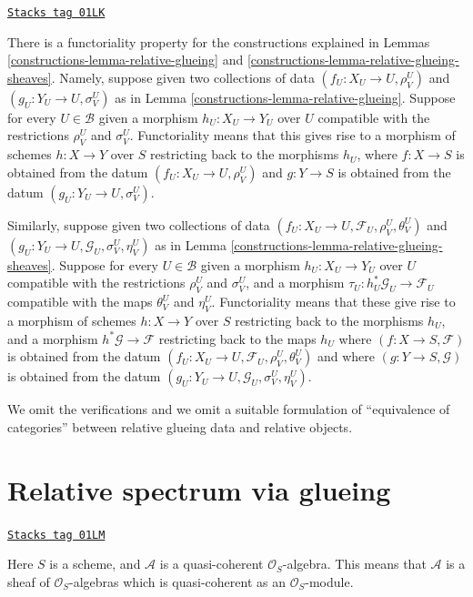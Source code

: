 \begin{remark}
\label{constructions-remark-relative-glueing-functorial}
\href{https://stacks.math.columbia.edu/tag/01LK}{\texttt{Stacks tag 01LK}}

There is a functoriality property for the constructions explained
in Lemmas \ref{constructions-lemma-relative-glueing} and
\ref{constructions-lemma-relative-glueing-sheaves}. Namely, suppose given
two collections of data $(f_U : X_U \to U, \rho^U_V)$ and
$(g_U : Y_U \to U, \sigma^U_V)$ as in Lemma \ref{constructions-lemma-relative-glueing}.
Suppose for every $U \in \mathcal{B}$ given
a morphism $h_U : X_U \to Y_U$ over $U$ compatible with
the restrictions $\rho^U_V$ and $\sigma^U_V$. Functoriality
means that this gives rise to a morphism of schemes
$h : X \to Y$ over $S$ restricting back to the morphisms $h_U$,
where $f : X \to S$ is obtained from
the datum $(f_U : X_U \to U, \rho^U_V)$ and $g : Y \to S$
is obtained from the datum $(g_U : Y_U \to U, \sigma^U_V)$.

\medskip\noindent
Similarly, suppose given
two collections of data
$(f_U : X_U \to U, \mathcal{F}_U, \rho^U_V, \theta^U_V)$ and
$(g_U : Y_U \to U, \mathcal{G}_U, \sigma^U_V, \eta^U_V)$
as in Lemma \ref{constructions-lemma-relative-glueing-sheaves}.
Suppose for every $U \in \mathcal{B}$ given
a morphism $h_U : X_U \to Y_U$ over $U$ compatible with
the restrictions $\rho^U_V$ and $\sigma^U_V$, and a morphism
$\tau_U : h_U^*\mathcal{G}_U \to \mathcal{F}_U$ compatible with
the maps $\theta^U_V$ and $\eta^U_V$. Functoriality
means that these give rise to a morphism of schemes
$h : X \to Y$ over $S$ restricting back to the morphisms $h_U$,
and a morphism $h^*\mathcal{G} \to \mathcal{F}$ restricting back
to the maps $h_U$
where $(f : X \to S, \mathcal{F})$ is obtained from the datum
$(f_U : X_U \to U, \mathcal{F}_U, \rho^U_V, \theta^U_V)$ and
where $(g : Y \to S, \mathcal{G})$ is obtained from the datum
$(g_U : Y_U \to U, \mathcal{G}_U, \sigma^U_V, \eta^U_V)$.

\medskip\noindent
We omit the verifications and we omit a suitable formulation of
``equivalence of categories'' between relative glueing data
and relative objects.
\end{remark}

\section{Relative spectrum via glueing}
\label{constructions-section-spec-via-glueing}
\begin{definition}
\label{constructions-situation-relative-spec}
\href{https://stacks.math.columbia.edu/tag/01LM}{\texttt{Stacks tag 01LM}}

Here $S$ is a scheme, and $\mathcal{A}$ is a quasi-coherent
$\mathcal{O}_S$-algebra. This means that $\mathcal{A}$ is a
sheaf of $\mathcal{O}_S$-algebras which is quasi-coherent as an
$\mathcal{O}_S$-module.
\end{definition}

